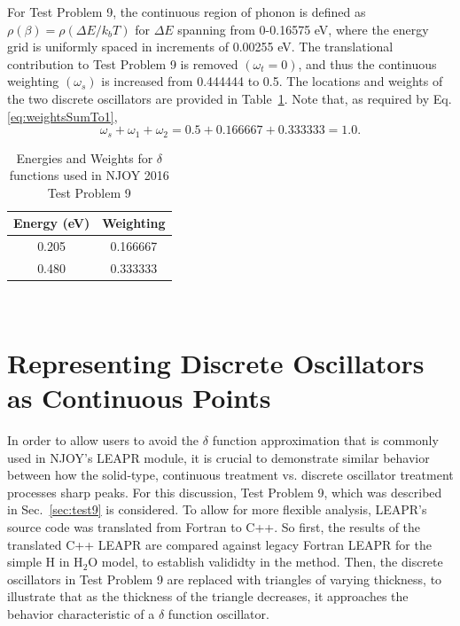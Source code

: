 \documentclass[Master.tex]{subfiles}
\begin{document}
  For Test Problem 9, the continuous region of phonon is defined as $\rho(\beta)=\rho(\Delta E/k_bT)$ for $\Delta E$ spanning from 0-0.16575 eV, where the energy grid is uniformly spaced in increments of 0.00255 eV. The translational contribution to Test Problem 9 is removed $(\omega_t=0)$, and thus the continuous weighting $(\omega_s)$ is increased from 0.444444 to 0.5.  The locations and weights of the two discrete oscillators are provided in Table~\ref{tab:test9_delta_facts}. Note that, as required by Eq.\ref{eq:weightsSumTo1}, 
  \begin{equation}
    \omega_s+\omega_1+\omega_2= 0.5 + 0.166667 + 0.333333 = 1.0.
  \end{equation}
  \begin{table}
    \centering
    \caption[Energies and Weights for $\delta$ functions used in NJOY 2016 Test Problem 9]{Energies and Weights for $\delta$ functions used in NJOY 2016 Test Problem 9}
    \label{tab:test9_delta_facts}
    \begin{tabular}{ |c|c| }\hline
      Energy (eV)& Weighting\\\hline
      0.205& 0.166667\\\hline
      0.480 & 0.333333 \\\hline
    \end{tabular}\\[1ex]
  \end{table}



\section{Representing Discrete Oscillators as Continuous Points}
  In order to allow users to avoid the $\delta$ function approximation that is commonly used in NJOY's LEAPR module, it is crucial to demonstrate similar behavior between how the solid-type, continuous treatment vs. discrete oscillator treatment processes sharp peaks. For this discussion, Test Problem 9, which was described in Sec.~\ref{sec:test9} is considered. To allow for more flexible analysis, LEAPR's source code was translated from Fortran to C++. So first, the results of the translated C++ LEAPR are compared against legacy Fortran LEAPR for the simple H in H$_2$O model, to establish valididty in the method. Then, the discrete oscillators in Test Problem 9 are replaced with triangles of varying thickness, to illustrate that as the thickness of the triangle decreases, it approaches the behavior characteristic of a $\delta$ function oscillator.
\end{document}
